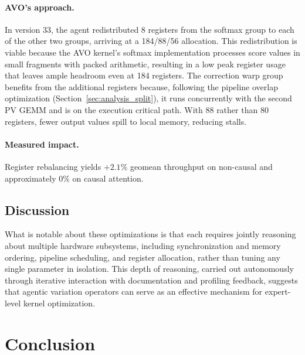 \documentclass{article}
\begin{document}
\paragraph{AVO's approach.}
In version 33, the agent redistributed 8 registers from the softmax group to each of the other two groups, arriving at a 184/88/56 allocation.
This redistribution is viable because the AVO kernel's softmax implementation processes score values in small fragments with packed arithmetic, resulting in a low peak register usage that leaves ample headroom even at 184 registers.
The correction warp group benefits from the additional registers because, following the pipeline overlap optimization (Section~\ref{sec:analysis_split}), it runs concurrently with the second PV GEMM and is on the execution critical path.
With 88 rather than 80 registers, fewer output values spill to local memory, reducing stalls.

\paragraph{Measured impact.}
Register rebalancing yields $+2.1\%$ geomean throughput on non-causal and approximately $0\%$ on causal attention.

\subsection{Discussion}
\label{sec:analysis_discussion}

What is notable about these optimizations is that each requires jointly reasoning about multiple hardware subsystems, including synchronization and memory ordering, pipeline scheduling, and register allocation, rather than tuning any single parameter in isolation.
This depth of reasoning, carried out autonomously through iterative interaction with documentation and profiling feedback, suggests that agentic variation operators can serve as an effective mechanism for expert-level kernel optimization.

% 

\section{Conclusion}
\label{sec:conclusion}
\end{document}
